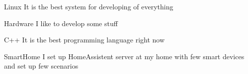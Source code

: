 



\begin{cvskills}

  \cvskill
    {Linux} %
    {It is the best system for developing of everything} %

  \cvskill
    {Hardware} %
    {I like to develop some stuff} %
    
  \cvskill
    {C++} %
    {It is the best programming language right now} %
    
  \cvskill
    {SmartHome} %
    {I set up HomeAssistent server at my home with few smart devices and set up few scenarios} %

\end{cvskills}